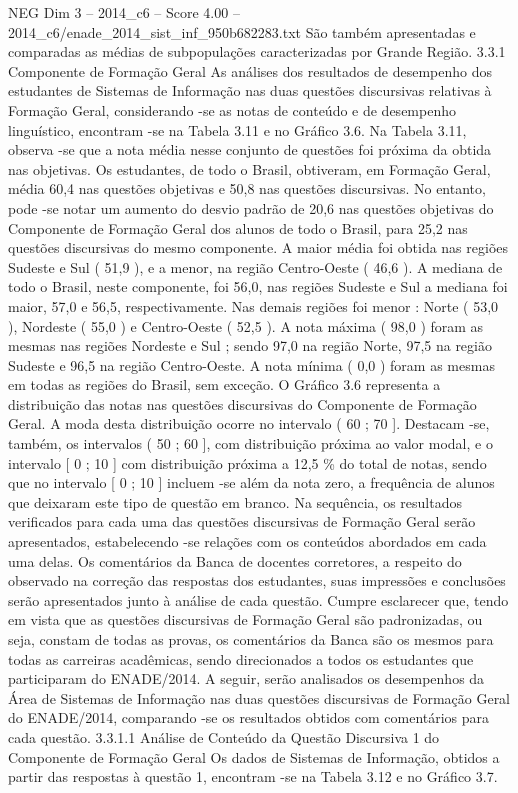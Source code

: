 \begin{textsample}{NEG Dim 3 – 2014\_c6 – Score 4.00 – 2014\_c6/enade\_2014\_sist\_inf\_950b682283.txt}
São também apresentadas e comparadas as médias de subpopulações caracterizadas por Grande Região. 3.3.1 Componente de Formação Geral As análises dos resultados de desempenho dos estudantes de Sistemas de Informação nas duas questões discursivas relativas à Formação Geral, considerando -se as notas de conteúdo e de desempenho linguístico, encontram -se na Tabela 3.11 e no Gráfico 3.6.
Na Tabela 3.11, observa -se que a nota média nesse conjunto de questões foi próxima da obtida nas objetivas.
Os estudantes, de todo o Brasil, obtiveram, em Formação Geral, média 60,4 nas questões objetivas e 50,8 nas questões discursivas.
No entanto, pode -se notar um aumento do desvio padrão de 20,6 nas questões objetivas do Componente de Formação Geral dos alunos de todo o Brasil, para 25,2 nas questões discursivas do mesmo componente.
A maior média foi obtida nas regiões Sudeste e Sul ( 51,9 ), e a menor, na região Centro-Oeste ( 46,6 ).
A mediana de todo o Brasil, neste componente, foi 56,0, nas regiões Sudeste e Sul a mediana foi maior, 57,0 e 56,5, respectivamente.
Nas demais regiões foi menor : Norte ( 53,0 ), Nordeste ( 55,0 ) e Centro-Oeste ( 52,5 ).
A nota máxima ( 98,0 ) foram as mesmas nas regiões Nordeste e Sul ; sendo 97,0 na região Norte, 97,5 na região Sudeste e 96,5 na região Centro-Oeste.
A nota mínima ( 0,0 ) foram as mesmas em todas as regiões do Brasil, sem exceção.
O Gráfico 3.6 representa a distribuição das notas nas questões discursivas do Componente de Formação Geral.
A moda desta distribuição ocorre no intervalo ( 60 ; 70 ].
Destacam -se, também, os intervalos ( 50 ; 60 ], com distribuição próxima ao valor modal, e o intervalo [ 0 ; 10 ] com distribuição próxima a 12,5 \% do total de notas, sendo que no intervalo [ 0 ; 10 ] incluem -se além da nota zero, a frequência de alunos que deixaram este tipo de questão em branco.
Na sequência, os resultados verificados para cada uma das questões discursivas de Formação Geral serão apresentados, estabelecendo -se relações com os conteúdos abordados em cada uma delas.
Os comentários da Banca de docentes corretores, a respeito do observado na correção das respostas dos estudantes, suas impressões e conclusões serão apresentados junto à análise de cada questão.
Cumpre esclarecer que, tendo em vista que as questões discursivas de Formação Geral são padronizadas, ou seja, constam de todas as provas, os comentários da Banca são os mesmos para todas as carreiras acadêmicas, sendo direcionados a todos os estudantes que participaram do ENADE/2014.
A seguir, serão analisados os desempenhos da Área de Sistemas de Informação nas duas questões discursivas de Formação Geral do ENADE/2014, comparando -se os resultados obtidos com comentários para cada questão. 3.3.1.1 Análise de Conteúdo da Questão Discursiva 1 do Componente de Formação Geral Os dados de Sistemas de Informação, obtidos a partir das respostas à questão 1, encontram -se na Tabela 3.12 e no Gráfico 3.7.

\end{textsample}
